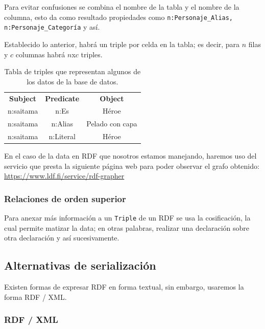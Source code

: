 \documentclass[conference]{IEEEtran}
\begin{document}
Para evitar confusiones se combina el nombre de la tabla y el nombre de la columna, esto da como resultado propiedades como
\texttt{n:Personaje\_Alias, n:Personaje\_Categoría} y así.

Establecido lo anterior, habrá un triple por celda en la tabla; es decir, para $n$ filas y $c$ columnas habrá $n$x$c$ triples.


\begin{table}[H]
\begin{center}
\begin{tabular}{|c|c|c|}
\textbf{Subject}& \textbf{Predicate} & \textbf{Object}  \\
     n:saitama & n:Es & Héroe \\
     n:saitama & n:Alias & Pelado con capa\\
     n:saitama & n:Literal & Héroe \\
\end{tabular}
\end{center}
\caption{Tabla de triples que representan algunos de los datos de la base de datos.}
\end{table}


En el caso de la data en RDF que nosotros estamos manejando, haremos uso del servicio que presta la siguiente página web para poder observar el grafo obtenido: \url{https://www.ldf.fi/service/rdf-grapher}\cite{b7}


\subsubsection{Relaciones de orden superior}

Para anexar más información a un \texttt{Triple} de un RDF se usa la cosificación, la cual permite matizar la data; en otras palabras, realizar una declaración sobre otra declaración y así sucesivamente.

\subsection{Alternativas de serialización}

Existen formas de expresar RDF en forma textual, sin embargo, usaremos la forma RDF / XML.

\subsubsection{RDF / XML}
\end{document}
